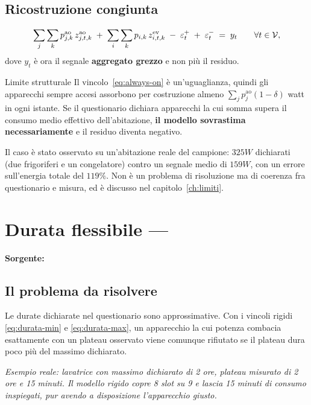 \subsection*{Ricostruzione congiunta}

\begin{equation}
  \sum_{j} \sum_{k} p^{\text{ao}}_{j,k} \, z^{\text{ao}}_{j,t,k}
  \;+\;
  \sum_{i} \sum_{k} p_{i,k} \, z^{\text{ev}}_{i,t,k}
  \;-\; \varepsilon^{+}_t \;+\; \varepsilon^{-}_t \;=\; y_t
  \qquad \forall t \in \mathcal{V} ,
\end{equation}
dove $y_t$ è ora il segnale \textbf{aggregato grezzo} e non più il residuo.

\begin{warnbox}{Limite strutturale}
Il vincolo~\eqref{eq:always-on} è un'uguaglianza, quindi gli apparecchi sempre accesi assorbono
per costruzione almeno $\sum_j p^{\text{ao}}_j (1-\delta)$ watt in ogni istante. Se il questionario
dichiara apparecchi la cui somma supera il consumo medio effettivo dell'abitazione, \textbf{il
modello sovrastima necessariamente} e il residuo diventa negativo.

Il caso è stato osservato su un'abitazione reale del campione: $325\unit{W}$ dichiarati
(due frigoriferi e un congelatore) contro un segnale medio di $159\unit{W}$, con un errore
sull'energia totale del $119\%$. Non è un problema di risoluzione ma di coerenza fra
questionario e misura, ed è discusso nel capitolo~\ref{ch:limiti}.
\end{warnbox}

\section{Durata flessibile --- }
\label{sec:m4}

\noindent\textbf{Sorgente:} 

\subsection*{Il problema da risolvere}

Le durate dichiarate nel questionario sono approssimative. Con i vincoli rigidi
\eqref{eq:durata-min} e \eqref{eq:durata-max}, un apparecchio la cui potenza combacia esattamente
con un plateau osservato viene comunque rifiutato se il plateau dura poco più del massimo
dichiarato.

\begin{center}
\begin{minipage}{0.9\textwidth}
\itshape
Esempio reale: lavatrice con massimo dichiarato di 2 ore, plateau misurato di 2 ore e 15 minuti.
Il modello rigido copre 8 slot su 9 e lascia 15 minuti di consumo inspiegati, pur avendo a
disposizione l'apparecchio giusto.
\end{minipage}
\end{center}

